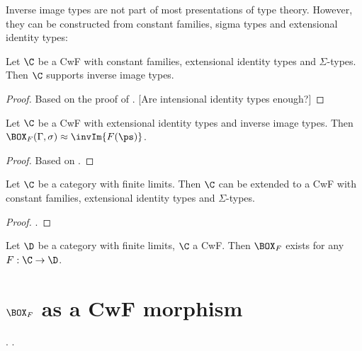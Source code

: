 \documentclass{article}
\begin{document}
Inverse image types are not part of most presentations of type theory.
However, they can be constructed from constant families, sigma types
and extensional identity types:

\begin{proposition}
  Let $\C$ be a CwF with constant families, extensional identity types
  and $\Sigma$-types. Then $\C$ supports inverse image types.
\end{proposition}
\begin{proof}
  Based on the proof of \cite[Prop.~9 and
  Lemma~25]{clairambaultDybjer2011lcccML}. [Are intensional identity
  types enough?]
\end{proof}

\begin{proposition}
  Let $\C$ be a CwF with extensional identity types and inverse image
  types.  Then $\BOX_F(\Gamma, \sigma) \approx \invIm{F(\ps)}$.
\end{proposition}
\begin{proof}
  Based on \cite[Lemma 25]{clairambaultDybjer2011lcccML}.
\end{proof}

\begin{theorem}
  Let $\C$ be a category with finite limits. Then $\C$ can be extended
  to a CwF with constant families, extensional identity types and
  $\Sigma$-types.
\end{theorem}
\begin{proof}
  \cite[Lemma 18]{clairambaultDybjer2011lcccML}.
\end{proof}

\begin{corollary}
  Let $\D$ be a category with finite limits, $\C$ a CwF. Then $\BOX_F$ exists for any $F : \C \to \D$.
\end{corollary}

\section{$\BOX_F$ as a CwF morphism}
\label{sec:box-as-cwf-morphism}

\cite[Def.~10]{clairambaultDybjer2011lcccML}.
\cite[Proof of Thm.~10]{clairambaultDybjer2011lcccML}.



\end{document}

